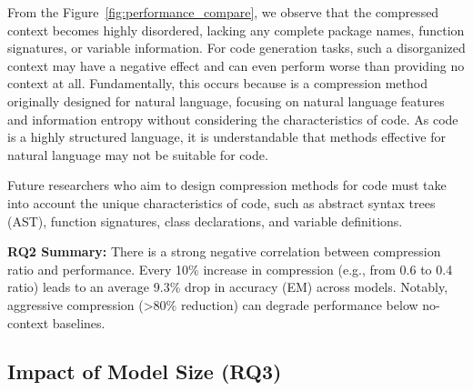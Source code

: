 
From the Figure~\ref{fig:performance_compare}, we observe that the compressed context becomes highly disordered, lacking any complete package names, function signatures, or variable information. For code generation tasks, such a disorganized context may have a negative effect and can even perform worse than providing no context at all. Fundamentally, this occurs because \llmlingua is a compression method originally designed for natural language, focusing on natural language features and information entropy without considering the characteristics of code. As code is a highly structured language, it is understandable that methods effective for natural language may not be suitable for code.

Future researchers who aim to design compression methods for code must take into account the unique characteristics of code, such as abstract syntax trees (AST), function signatures, class declarations, and variable definitions.
\begin{center}
    \begin{myboxc} \textbf{RQ2 Summary: } %
    There is a strong negative correlation between compression ratio and performance. Every 10\% increase in compression (e.g., from 0.6 to 0.4 ratio) leads to an average 9.3\% drop in accuracy (EM) across models. Notably, aggressive compression (>80\% reduction) can degrade performance below no-context baselines.
    
    \end{myboxc} %
\end{center}

\subsection{Impact of Model Size (RQ3)}

